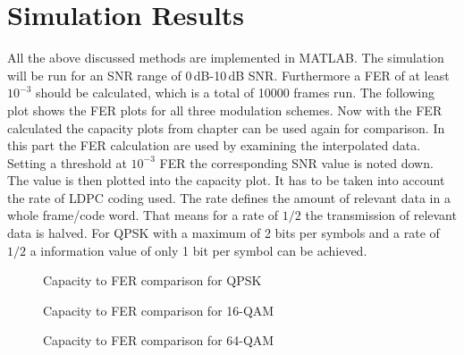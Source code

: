 \section{Simulation Results}
All the above discussed methods are implemented in MATLAB.
The simulation will be run for an SNR range of 0\,dB-10\,dB SNR. Furthermore a \gls{FER} of at least $10^{-3}$ should be calculated, which is a total of 10000 frames run. The following plot shows the \gls{FER} plots for all three modulation schemes.
Now with the  \gls{FER} calculated the capacity plots from chapter  can be used again for comparison. In this part the FER calculation are used by examining the interpolated data. Setting a threshold at $10^{-3}$ FER the corresponding SNR value is noted down. The value is then plotted into the capacity plot. It has to be taken into account the rate of \gls{LDPC} coding used. The rate defines the amount of relevant data in a whole frame/code word. That means for a rate of $1/2$ the transmission of relevant data is halved. For QPSK with a maximum of 2 bits per symbols and a rate of $1/2$ a information value of only 1 bit per symbol can be achieved.
\newline
\begin{figure}[!htb]
	\setlength{}
	\setlength\fheight{0.4\textheight}
	\centering
	
	\caption{Capacity to FER comparison for QPSK}
	\label{fig:llr1}
\end{figure}
\begin{figure}[!htb]
	\setlength{}
	\setlength\fheight{0.4\textheight}	
	\centering
	
	\caption{Capacity to FER comparison for 16-QAM}
	\label{fig:llr2}
\end{figure}
\begin{figure}[!h]
	\setlength{}
	\setlength\fheight{0.4\textheight}
	\centering
	
	\caption{Capacity to FER comparison for 64-QAM}
	\label{fig:llr3}
\end{figure}

